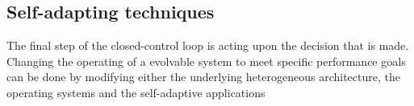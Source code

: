 \subsection{Self-adapting techniques}
\label{sec:selfadapting}

The final step of the closed-control loop is acting upon the decision that is made. Changing the operating of a evolvable system to meet specific performance goals can be done by modifying either the underlying heterogeneous architecture, the operating systems and the self-adaptive applications \cite{evolvable}